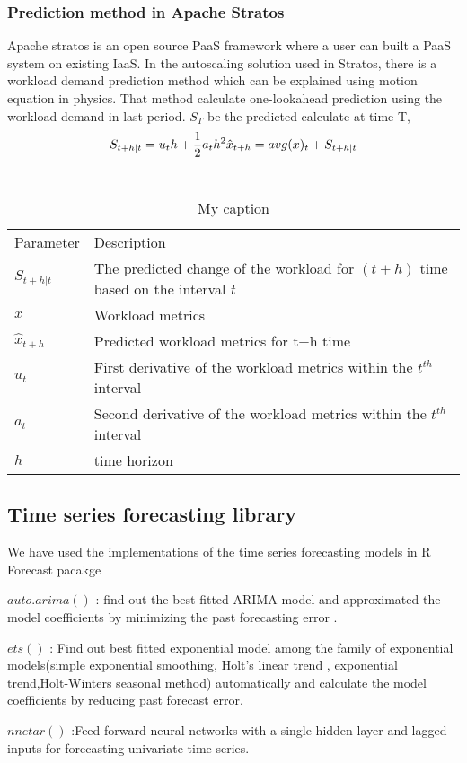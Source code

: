 \subsubsection{Prediction method in Apache Stratos}

Apache stratos is an open source PaaS framework where a user can built a PaaS system on existing IaaS. In the autoscaling solution used in Stratos, there is a workload demand prediction method which can be explained using motion equation in physics. That method calculate one-lookahead prediction using the workload demand in last period.
$S_T$ be the predicted  calculate at time T, 
$$S_{t+h|t} = u_{t}h+ \frac{1}{2} a_{t}h^2 \\
\hat{x}_{t+h}=avg(x)_{t}  + S_{t+h|t}$$ \\

\begin{table}[]
\centering
\caption{My caption}
\label{my-label}
\begin{tabular}{ll}
Parameter       & Description                                                                     \\
$S_{t+h|t}$     & The predicted change of the workload for $(t+h)$ time based on the interval $t$ \\
$x$             & Workload metrics                                                                \\
$\hat{x}_{t+h}$ & Predicted workload metrics for t+h time                                         \\
$u_{t}$         & First derivative of the workload metrics within the $t^{th}$ interval           \\
$a_{t}$         & Second derivative of the workload metrics within the $t^{th}$ interval          \\
$h$             & time horizon                                                                   
\end{tabular}
\end{table}


\subsection{Time series forecasting library}

We have used the implementations of the time series forecasting models in R Forecast pacakge \cite{forecastPackage}

$auto.arima()$ :  find out the best fitted ARIMA model and approximated the model coefficients by minimizing the past forecasting error \cite{Forecasting_OTexts}.

$ets()$ : Find out best fitted exponential model among the family of exponential models(simple exponential smoothing, Holt's linear trend , exponential trend,Holt-Winters seasonal method) automatically and calculate the model coefficients by reducing past forecast error. \cite{Forecasting_OTexts}
    
$nnetar()$ :Feed-forward neural networks with a single hidden layer and lagged inputs for forecasting univariate time series.
